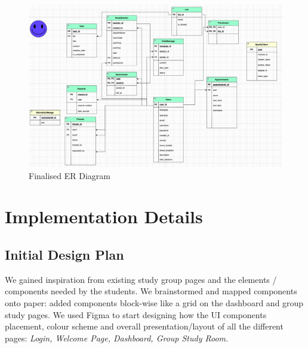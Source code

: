 \begin{figure}
    \centering
    \includegraphics[width=1\linewidth]{ER-diagram}
    \caption{Finalised ER Diagram}
    \label{fig:er-diagram}
\end{figure}


\section{Implementation Details}
\label{sect:implementation-details}
\subsection{Initial Design Plan}
We gained inspiration from existing study group pages and the elements / components needed by the students. We brainstormed and mapped components onto paper: added components block-wise like a grid on the dashboard and group study pages. We used Figma to start designing how the UI components placement, colour scheme and overall presentation/layout of all the different pages: \textit{Login, Welcome Page, Dashboard, Group Study Room.}

